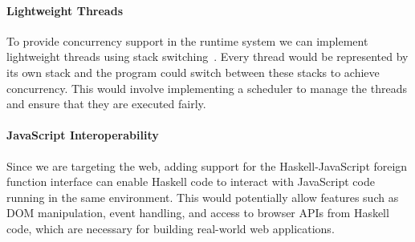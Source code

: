 \paragraph{Lightweight Threads} To provide concurrency support in the runtime system we can implement lightweight threads using stack switching~\cite{stackswitching}. Every thread would be represented by its own stack and the program could switch between these stacks to achieve concurrency. This would involve implementing a scheduler to manage the threads and ensure that they are executed fairly.

\paragraph{JavaScript Interoperability} Since we are targeting the web, adding support for the Haskell-JavaScript foreign function interface can enable Haskell code to interact with JavaScript code running in the same environment. This would potentially allow features such as DOM manipulation, event handling, and access to browser APIs from Haskell code, which are necessary for building real-world web applications.